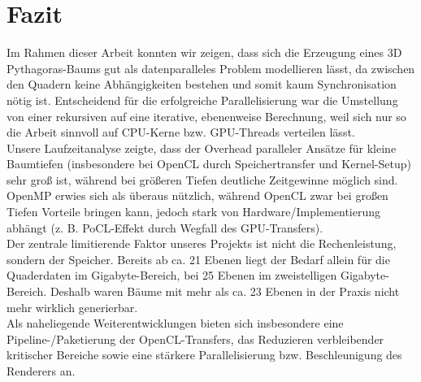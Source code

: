 \section{Fazit}
Im Rahmen dieser Arbeit konnten wir zeigen, dass sich die Erzeugung eines 3D Pythagoras-Baums gut als datenparalleles Problem
modellieren lässt, da zwischen den Quadern keine Abhängigkeiten bestehen und somit kaum Synchronisation nötig ist. Entscheidend 
für die erfolgreiche Parallelisierung war die Umstellung von einer rekursiven auf eine iterative, ebenenweise Berechnung, weil sich 
nur so die Arbeit sinnvoll auf CPU-Kerne bzw. GPU-Threads verteilen lässt.\\
Unsere Laufzeitanalyse zeigte, dass der Overhead paralleler Ansätze für kleine Baumtiefen (insbesondere bei OpenCL durch 
Speichertransfer und Kernel-Setup) sehr groß ist, während bei größeren Tiefen deutliche Zeitgewinne möglich sind. OpenMP erwies 
sich als überaus nützlich, während OpenCL zwar bei großen Tiefen Vorteile bringen kann, jedoch stark von 
Hardware/Implementierung abhängt (z. B. PoCL-Effekt durch Wegfall des GPU-Transfers).\\
Der zentrale limitierende Faktor unseres Projekts ist nicht die Rechenleistung, sondern der Speicher. Bereits ab ca. 21 Ebenen
liegt der Bedarf allein für die Quaderdaten im Gigabyte-Bereich, bei 25 Ebenen im zweistelligen Gigabyte-Bereich.
Deshalb waren Bäume mit mehr als ca. 23 Ebenen in der Praxis nicht mehr wirklich generierbar.\\
Als naheliegende Weiterentwicklungen bieten sich insbesondere eine Pipeline-/Paketierung der OpenCL-Transfers, das Reduzieren 
verbleibender kritischer Bereiche sowie eine stärkere Parallelisierung bzw. Beschleunigung des Renderers an.